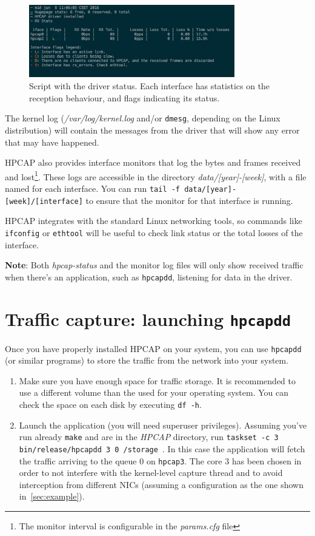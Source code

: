 \documentclass[a4paper,oneside]{hpman}
\begin{document}
\begin{figure}[hbtp]
\centering
\includegraphics[width=0.8\textwidth]{figs/hpcap-status.png}
\caption{Script with the driver status. Each interface has statistics on the reception behaviour, and flags indicating its status.}
\label{fig:hpcap-status}
\end{figure}

The kernel log (\textit{/var/log/kernel.log} and/or \texttt{dmesg}, depending on the Linux distribution) will contain the messages from the driver that will show any error that may have happened.

HPCAP also provides interface monitors that log the bytes and frames received and lost\footnote{The monitor interval is configurable in the \textit{params.cfg} file}. These logs are accessible in the directory \textit{data/[year]-[week]}, with a file named for each interface. You can run \texttt{tail -f data/[year]-[week]/[interface]} to ensure that the monitor for that interface is running.

HPCAP integrates with the standard Linux networking tools, so commands like \texttt{ifconfig} or \texttt{ethtool} will be useful to check link status or the total losses of the interface.

\textbf{Note}: Both \textit{hpcap-status} and the monitor log files will only show received traffic when there's an application, such as \texttt{hpcapdd}, listening for data in the driver.


\section{Traffic capture: launching \texttt{hpcapdd}}
\label{sec:QuickCapture}

Once you have properly installed HPCAP on your system, you can use \texttt{hpcapdd} (or similar programs) to store the traffic from the network into your system.

\begin{enumerate}
\item Make sure you have enough space for traffic storage. It is recommended to use a different volume than the used for your operating system. You can check the space on each disk by executing \texttt{df -h}.

\item Launch the application (you will need superuser privileges). Assuming you've run already \texttt{make} and are in the \textit{HPCAP} directory, run \texttt{taskset -c 3 bin/release/hpcapdd 3 0 /storage }. In this case the application will fetch the traffic arriving to the queue $0$ on \texttt{hpcap3}. The core $3$ has been chosen in order to not interfere with the kernel-level capture thread and to avoid interception from different NICs (assuming a configuration as the one shown in~\ref{sec:example}).
\end{enumerate}
\end{document}
